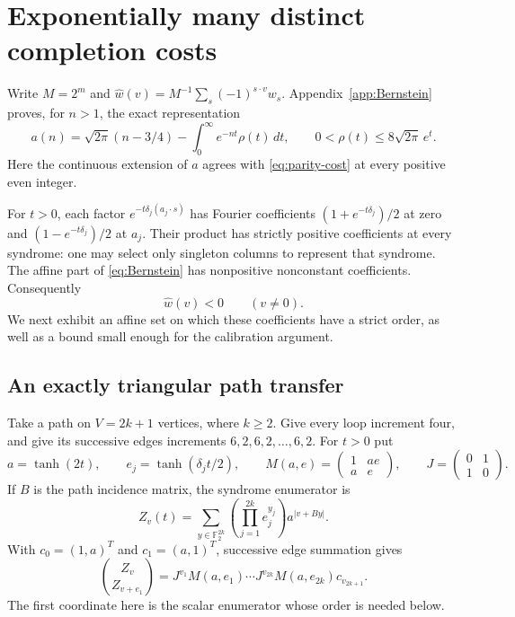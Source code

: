 \section{Exponentially many distinct completion costs}
\label{sec:sparse-degree-separation}

Write $M=2^m$ and
$\widehat w(v)=M^{-1}\sum_s(-1)^{s\cdot v}w_s$.
Appendix~\ref{app:Bernstein} proves, for $n>1$, the exact representation
\begin{equation}\label{eq:Bernstein}
 a(n)=\sqrt{2\pi}(n-3/4)
       -\int_0^\infty e^{-nt}\rho(t)\,dt,
 \qquad 0<\rho(t)\le8\sqrt{2\pi}\,e^t.
\end{equation}
Here the continuous extension of $a$ agrees with
\eqref{eq:parity-cost} at every positive even integer.

For $t>0$, each factor $e^{-t\delta_j(a_j\cdot s)}$ has Fourier
coefficients $(1+e^{-t\delta_j})/2$ at zero and
$(1-e^{-t\delta_j})/2$ at $a_j$. Their product has strictly positive
coefficients at every syndrome: one may select only singleton columns
to represent that syndrome. The affine part of \eqref{eq:Bernstein}
has nonpositive nonconstant coefficients. Consequently
\begin{equation}\label{eq:all-negative-costs}
 \widehat w(v)<0\qquad(v\ne0).
\end{equation}
We next exhibit an affine set on which these coefficients have a strict
order, as well as a bound small enough for the calibration argument.

\subsection{An exactly triangular path transfer}

Take a path on $V=2k+1$ vertices, where $k\ge2$. Give every loop
increment four, and give its successive edges increments
$6,2,6,2,\ldots,6,2$. For $t>0$ put
\[
 a=\tanh(2t),\qquad e_j=\tanh(\delta_jt/2),\qquad
 M(a,e)=\begin{pmatrix}1&ae\\a&e\end{pmatrix},\qquad
 J=\begin{pmatrix}0&1\\1&0\end{pmatrix}.
\]
If $B$ is the path incidence matrix, the syndrome enumerator is
\[
 Z_v(t)=\sum_{y\in\mathbb F_2^{2k}}
             \left(\prod_{j=1}^{2k}e_j^{y_j}\right)a^{|v+By|}.
\]
With $c_0=(1,a)^T$ and $c_1=(a,1)^T$, successive edge summation gives
\begin{equation}\label{eq:path-transfer-pair}
 \binom{Z_v}{Z_{v+e_1}}
 =J^{v_1}M(a,e_1)\cdots J^{v_{2k}}M(a,e_{2k})c_{v_{2k+1}}.
\end{equation}
The first coordinate here is the scalar enumerator whose order is
needed below.

